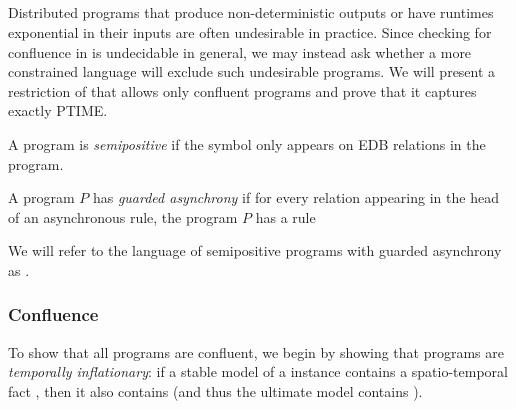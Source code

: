 \subsection{\large \bf \slang}
\label{sec:plus}

Distributed programs that produce non-deterministic outputs or have runtimes
exponential in their inputs are often undesirable in practice. Since checking for
confluence in \lang is undecidable in general, we may instead ask whether a more
constrained language will exclude such undesirable programs. %
We will present a restriction of \lang that allows only
confluent programs and prove that it captures exactly PTIME.

\begin{definition}
A \lang program is {\em semipositive} if the \dedalus{$\lnot$} symbol only appears on EDB relations in the program.
\end{definition}

\begin{definition}
A \lang program $P$ has {\em guarded asynchrony} if for every relation  appearing in the head of an asynchronous rule, the program $P$ has a rule 
\end{definition}

We will refer to the language of semipositive \lang programs with guarded
asynchrony as \slang.

\subsubsection{Confluence}

To show that all \slang programs are confluent, we begin by showing that \slang
programs are {\em temporally inflationary}: if a stable model of a \slang
instance contains a spatio-temporal fact , then it also contains
 (and thus the ultimate model contains ).

